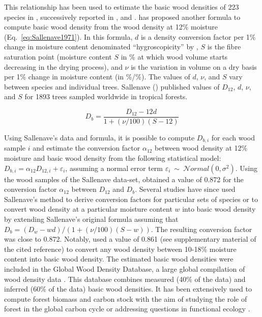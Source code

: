 \documentclass[a4paper, 12pt, leqno, dvipsnames]{article}\usepackage[]{graphicx}\usepackage[]{color}
\begin{document}
This relationship has been used to estimate the basic wood densities of 223 species in \citet{Reyes1992}, successively reported in \cite{Brown1997}, \citet{IPCC2006} and \citet{Zanne2009}. \citet{Sallenave1971} has proposed another formula to compute basic wood density from the wood density at 12\% moisture (Eq.~\ref{eq:Sallenave1971}). In this formula, $d$ is a density conversion factor per 1\% change in moisture content denominated ``hygroscopicity'' by \citet{Sallenave1971}, $S$ is the fibre saturation point (moisture content $S$ in \% at which wood volume starts decreasing in the drying process), and $\nu$ is the variation in volume on a dry basis per 1\% change in moisture content (in \%/\%). The values of $d$, $\nu$, and $S$ vary between species and individual trees. Sallenave (\citeyear{Sallenave1955, Sallenave1964, Sallenave1971}) published values of $D_{12}$, $d$, $\nu$, and $S$ for 1893 trees sampled worldwide in tropical forests.

\begin{equation}
  \label{eq:Sallenave1971}
  D_b=\frac{D_{12} - 12 d}{1+(\nu/100)(S-12)}
\end{equation}

Using Sallenave's data and formula, it is possible to compute $D_{b,i}$ for each wood sample $i$ and estimate the conversion factor $\alpha_{12}$ between wood density at 12\% moisture and basic wood density from the following statistical model: $D_{b,i} = \alpha_{12} D_{12,i} + \varepsilon_i$, assuming a normal error term $\varepsilon_i~\sim~\mathcal{N}ormal(0,\sigma^2)$. Using the wood samples of the Sallenave data-set, \citet{Chave2006} obtained a value of 0.872 for the conversion factor $\alpha_{12}$ between $D_{12}$ and $D_b$. Several studies have since used Sallenave's method to derive conversion factors for particular sets of species \citep{Muller-Landau2004} or to convert wood density at a particular moisture content $w$ into basic wood density \citep{Bastin2015, Chave2009, Swenson2007} by extending Sallenave's original formula assuming that $D_b=(D_{w} - w d)/(1+(\nu/100)(S-w))$. The resulting conversion factor was close to 0.872. Notably, \citet{Chave2009} used a value of 0.861 (see supplementary material of the cited reference) to convert any wood density between 10-18\% moisture content into basic wood density. The estimated basic wood densities were included in the Global Wood Density Database, a large global compilation of wood density data \citep{Chave2009, Zanne2009}. This database combines measured (40\% of the data) and inferred (60\% of the data) basic wood densities. It has been extensively used to compute forest biomass and carbon stock with the aim of studying the role of forest in the global carbon cycle \citep{Saatchi2011, Baccini2012, Avitabile2016, Baccini2017, Vieilledent2016} or addressing questions in functional ecology \citep{Chave2009, Baraloto2010, Kunstler2016}.
\end{document}
